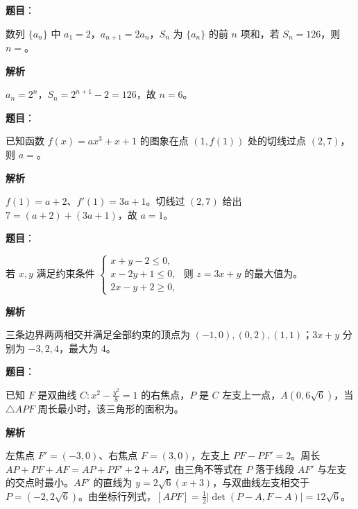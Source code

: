 \begin{answer}

\textbf{题目}：

数列 $\{a_n\}$ 中 $a_1=2$，$a_{n+1}=2a_n$，$S_n$ 为 $\{a_n\}$ 的前 $n$ 项和，若 $S_n=126$，则 $n=$\gkblank{}。

\textbf{解析}

$a_n=2^n$，$S_n=2^{n+1}-2=126$，故 $n=6$。


\end{answer}
\begin{answer}

\textbf{题目}：

已知函数 $f(x)=ax^3+x+1$ 的图象在点 $(1,f(1))$ 处的切线过点 $(2,7)$，则 $a=$\gkblank{}。

\textbf{解析}

$f(1)=a+2$、$f'(1)=3a+1$。切线过 $(2,7)$ 给出 $7=(a+2)+(3a+1)$，故 $a=1$。


\end{answer}
\begin{answer}

\textbf{题目}：

若 $x,y$ 满足约束条件 $\begin{cases}x+y-2\leqslant0,\\x-2y+1\leqslant0,\\2x-y+2\geqslant0,\end{cases}$ 则 $z=3x+y$ 的最大值为\gkblank{}。

\textbf{解析}

三条边界两两相交并满足全部约束的顶点为 $(-1,0),(0,2),(1,1)$；$3x+y$ 分别为 $-3,2,4$，最大为 4。


\end{answer}
\begin{answer}

\textbf{题目}：

已知 $F$ 是双曲线 $C:x^2-\frac{y^2}{8}=1$ 的右焦点，$P$ 是 $C$ 左支上一点，$A(0,6\sqrt6)$，当 $\triangle APF$ 周长最小时，该三角形的面积为\gkblank{}。

\textbf{解析}

左焦点 $F'=(-3,0)$、右焦点 $F=(3,0)$，左支上 $PF-PF'=2$。周长 $AP+PF+AF=AP+PF'+2+AF$，由三角不等式在 $P$ 落于线段 $AF'$ 与左支的交点时最小。$AF'$ 的直线为 $y=2\sqrt6(x+3)$，与双曲线左支相交于 $P=(-2,2\sqrt6)$。由坐标行列式，$[APF]=\frac12|\det(P-A,F-A)|=12\sqrt6$。


\end{answer}
